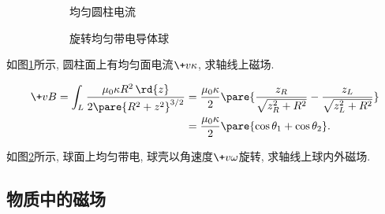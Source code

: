 \documentclass[hidelinks]{ctexart}
\begin{document}
\begin{figure}
    \centering
    \begin{subfigure}[b]{.45\textwidth}
        \centering
        \caption{均匀圆柱电流}
        \label{fig:均匀圆柱电流}
    \end{subfigure}
    \begin{subfigure}[b]{.45\textwidth}
        \centering
        \caption{旋转均匀带电导体球}
        \label{fig:旋转均匀带电导体球}
    \end{subfigure}
    \caption{}
    \label{fig:特殊构型应用例题}
\end{figure}
\begin{sample}
    \begin{ex}
        如图\cref{fig:均匀圆柱电流}所示, 圆柱面上有均匀面电流$\+v{\kappa}$, 求轴线上磁场.
    \end{ex}
    \begin{solution}
        \begin{align*}
        \+v{B} = \int_L \frac{\mu_0 \kappa R^2 \,\rd{z}}{2\pare{R^2+z^2}^{3/2}} &= \frac{\mu_0\kappa}{2}\pare{\frac{z_R}{\sqrt{z_R^2 + R^2}} - \frac{z_L}{\sqrt{z_L^2 + R^2}}}\\ &= \frac{\mu_0\kappa}{2}\pare{\cos{\theta_1}+\cos{\theta_2}}.
        \end{align*}
    \end{solution}
\end{sample}
\begin{sample}
    \begin{ex}
        如图\cref{fig:旋转均匀带电导体球}所示, 球面上均匀带电, 球壳以角速度$\+v{\omega}$旋转, 求轴线上球内外磁场.
    \end{ex}
    \begin{solution}
        
    \end{solution}
\end{sample}



\subsection{物质中的磁场} %
\label{sub:物质中的磁场}
\end{document}

